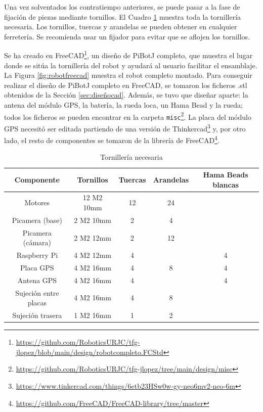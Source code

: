 Una vez solventados los contratiempo anteriores, se puede pasar a la fase de fijación de piezas mediante tornillos. El Cuadro \ref{cuadro:tornillos} muestra toda la tornillería necesaria. Los tornillos, tuercas y arandelas se pueden obtener en cualquier ferretería. Se recomienda usar un fijador para evitar que se aflojen los tornillos.

Se ha creado en FreeCAD\footnote{\url{https://github.com/RoboticsURJC/tfg-jlopez/blob/main/design/robotcompleto.FCStd}}, un diseño de PiBotJ completo, que muestra el lugar donde se sitúa la tornillería del robot y ayudará al usuario facilitar el ensamblaje. La Figura \ref{fig:robotfreecad} muestra el robot completo montado. Para conseguir realizar el diseño de PiBotJ completo en FreeCAD, se tomaron los ficheros .stl obtenidos de la Sección \ref{sec:diseñocad}. Además, se tuvo que diseñar aparte: la antena del módulo \acs{GPS}, la batería, la rueda loca, un Hama Bead y la rueda; todos los ficheros se pueden encontrar en la carpeta \verb|misc|\footnote{\url{https://github.com/RoboticsURJC/tfg-jlopez/tree/main/design/misc}}. La placa del módulo \acs{GPS} necesitó ser editada partiendo de una versión de Thinkercad\footnote{\url{https://www.tinkercad.com/things/6etb23HSw0w-gy-neo6mv2-neo-6m}} y, por otro lado, el resto de componentes se tomaron de la librería de FreeCAD\footnote{\url{https://github.com/FreeCAD/FreeCAD-library/tree/master}}.

\begin{table}[H]
	\begin{center}
		\begin{tabular}{|c|c|c|c|c|}
			\hline
			Componente & Tornillos & Tuercas & Arandelas & Hama Beads blancas\\
			\hline
			Motores & 12 M2 10mm & 12 & 24 &\\
			\hline
			Picamera (base) & 2 M2 10mm & 2 & 4 &\\
			\hline
			Picamera (cámara) & 2 M2 12mm & 2 & 12 &\\
			\hline
			Raspberry Pi & 4 M2 12mm & 4 & & 4\\
			\hline
			Placa GPS & 4 M2 16mm & 4 & 8 & 4\\
			\hline
			Antena GPS & 4 M2 16mm & 4 & & 4\\
			\hline
			Sujeción entre placas & 4 M2 16mm & 4 & 8 &\\
			\hline
			Sujeción trasera & 1 M2 16mm & 1 & 2 &\\
			\hline
		\end{tabular}
		\caption{Tornillería necesaria}
		\label{cuadro:tornillos}
	\end{center}
\end{table}

